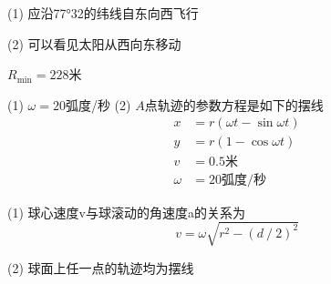 \answer (1) 应沿77°32的纬线自东向西飞行

(2) 可以看见太阳从西向东移动

\answer $ R _ { \text{min} } = 2 2 8   $米

\answer (1) $ \omega = 2 0   $弧度/秒
(2) $ A $点轨迹的参数方程是如下的摆线
\begin{align*}
    x &= r \left( \omega t - \sin \omega t \right)  \\
    y &= r \left( 1 - \cos \omega t \right) \\
    v &= 0 . 5  \text{米} \\
    \omega &= 2 0 \text{弧度/秒}
\end{align*}

\answer (1) 球心速度v与球滚动的角速度a的关系为
\begin{equation*}
    v = \omega \sqrt { r ^ { 2 } - \left( d \operatorname{/} { { 2 } } \right) ^ { 2 } }
\end{equation*}

(2) 球面上任一点的轨迹均为摆线
